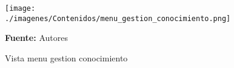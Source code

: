 \begin{figure}[!htb]
  \begin{center}
\texttt{[image: ./imagenes/Contenidos/menu\_gestion\_conocimiento.png]}
    \caption{Vista menu gestion conocimiento}
    \label{fig:Vista_menu_gestion_conocimiento}
    \textbf{Fuente:}  Autores
  \end{center}
\end{figure}
